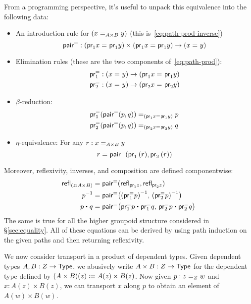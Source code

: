 From a programming perspective, it's useful to unpack this equivalence into the following data:

\newcommand{\pairpath}{\mathsf{pair}^{\mathord{=}}}
\newcommand{\projpath}[1]{\proj{#1}^{\mathord{=}}}

\begin{itemize}
\item An introduction rule for $(\id[A \times B]{x}{y})$ (this is~\eqref{eq:path-prod-inverse})
  \[
  \pairpath : (\id{\proj{1} x}{\proj{1} y}) \times (\id{\proj{1} x}{\proj{1} y}) \to {(\id x y)}
  \]
\item Elimination rules (these are the two components of~\eqref{eq:path-prod}):
  \begin{align*}
    \projpath{1} &: (\id{x}{y}) \to (\id{\proj{1} x}{\proj{1} y})\\
    \projpath{2} &: (\id{x}{y}) \to (\id{\proj{2} x}{\proj{2} y})
  \end{align*}
\item $\beta$-reduction:
  \begin{align*}
    {\projpath{1}{(\pairpath(p, q)})}
    &=_{(\id{\proj{1} x}{\proj{1} y})}
    {p} \\
    {\projpath{2}{(\pairpath(p,q)})}
    &=_{(\id{\proj{2} x}{\proj{2} y})}
    {q}
  \end{align*}
\item $\eta$-equivalence: For any $r : \id[A \times B] x y$
  \[
  \id{r}{\pairpath(\projpath{1} (r), \projpath{2} (r)) }
  \]
\end{itemize}
Moreover, reflexivity, inverses, and composition are defined componentwise:
\begin{align*}
  {\refl{(z : A \times B)}}
  &= {\pairpath (\refl{\proj{1} z},\refl{\proj{2} z})} \\
  {\opp{p}}
  &= {\pairpath \big(\opp{(\projpath{1} p)},\, \opp{(\projpath{2} p)}\big)} \\
  {{p \ct q}}
  &= {\pairpath \big({\projpath{1} p} \ct {\projpath{1} q},\,{\projpath{2} p} \ct {\projpath{2} q}\big)}
\end{align*}
The same is true for all the higher groupoid structure considered in \S\ref{sec:equality}.
All of these equations can be derived by using path induction on the given paths and then returning reflexivity.  

We now consider transport in a product of dependent types.
Given dependent types $ A, B : Z \to \type$, we abusively write $A\times B:Z\to \type$ for the dependent type defined by $(A\times B)(z) \defeq A(z) \times B(z)$.
Now given $p : \id[Z]{z}{w}$ and $x : A(z) \times B(z)$, we can transport $x$ along $p$ to obtain an element of $A(w)\times B(w)$.

